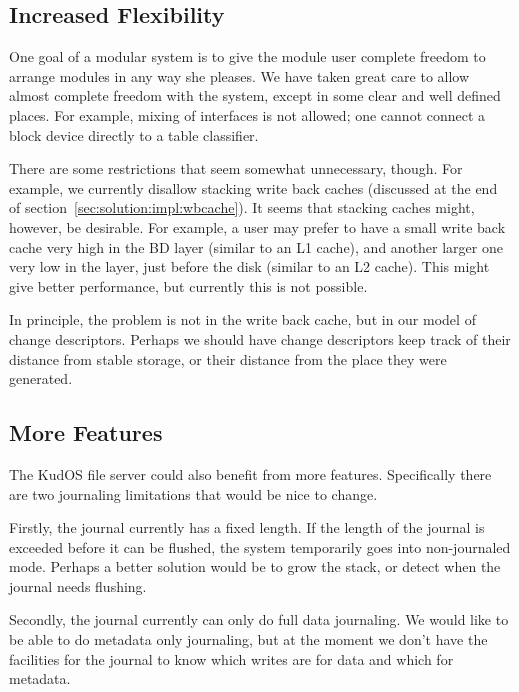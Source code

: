 \subsection{Increased Flexibility}
\label{sec:future:flexibility}

One goal of a modular system is to give the module user complete freedom to
arrange modules in any way she pleases. We have taken great care to allow almost
complete freedom with the system, except in some clear and well defined places.
For example, mixing of interfaces is not allowed; one cannot connect a block
device directly to a table classifier.

There are some restrictions that seem somewhat unnecessary, though. For example,
we currently disallow stacking write back caches (discussed at the end of
section~\ref{sec:solution:impl:wbcache}). It seems that stacking caches might,
however, be desirable. For example, a user may prefer to have a small write back
cache very high in the BD layer (similar to an L1 cache), and another larger one
very low in the layer, just before the disk (similar to an L2 cache). This might
give better performance, but currently this is not possible.

In principle, the problem is not in the write back cache, but in our model of
change descriptors. Perhaps we should have change descriptors keep track of
their distance from stable storage, or their distance from the place they were
generated.

\subsection{More Features}
\label{sec:future:features}

The KudOS file server could also benefit from more features. Specifically there
are two journaling limitations that would be nice to change.

Firstly, the journal currently has a fixed length. If the length of the journal
is exceeded before it can be flushed, the system temporarily goes into non-journaled mode.
Perhaps a better solution would be to grow the stack, or detect when the
journal needs flushing.

Secondly, the journal currently can only do full data journaling. We would like
to be able to do metadata only journaling, but at the moment we don't have the
facilities for the journal to know which writes are for data and which for
metadata.
